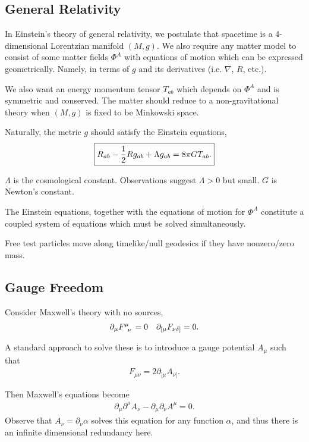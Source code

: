 \subsection{General Relativity}

In Einstein's theory of general relativity, we postulate that spacetime is a 4-dimensional Lorentzian manifold $\left( M,g \right) $. We also require any matter model to consist of some matter fields $\Phi^{A}$ with equations of motion which can be expressed geometrically. Namely, in terms of $g$ and its derivatives (i.e. $\nabla$, $R$, etc.).

We also want an energy momentum tensor $T_{ab}$ which depends on $\Phi^{A}$ and is symmetric and conserved.  The matter should reduce to a non-gravitational theory when $\left( M,g \right) $ is fixed to be Minkowski space.

Naturally, the metric $g$ should satisfy the Einstein equations,
\begin{align}
    \fbox{$\displaystyle R_{ab} - \frac{1}{2}R g_{ab} + \Lambda g_{ab} = 8 \pi G T_{ab}$.} 
\end{align}

$\Lambda$ is the cosmological constant. Observations suggest $\Lambda > 0$ but small. $G$ is Newton's constant.

The Einstein equations, together with the equations of motion for $\Phi^{A}$ constitute a coupled system of equations which must be solved simultaneously.

\begin{postulate}
    Free test particles move along timelike/null geodesics if they have nonzero/zero mass.
\end{postulate}

\subsection{Gauge Freedom}

Consider Maxwell's theory with no sources, 
\begin{align}
    \partial_\mu \tensor{F}{^{\mu}_\nu} = 0 && \partial_{[\mu} F_{\nu \delta ]} = 0
.\end{align}

A standard approach to solve these is to introduce a gauge potential $A_{\mu}$ such that
\begin{align}
    F_{\mu \nu} = 2\partial_{[\mu} A_{\nu ]}
.\end{align}

Then Maxwell's equations become
\begin{align}
    \partial_\mu \partial^{\mu} A_{\nu} - \partial_\mu \partial_\nu A^{\mu} = 0
.\end{align}
Observe that $A_\nu = \partial_\nu \alpha  $ solves this equation for any function $\alpha$, and thus there is an infinite dimensional redundancy here.

